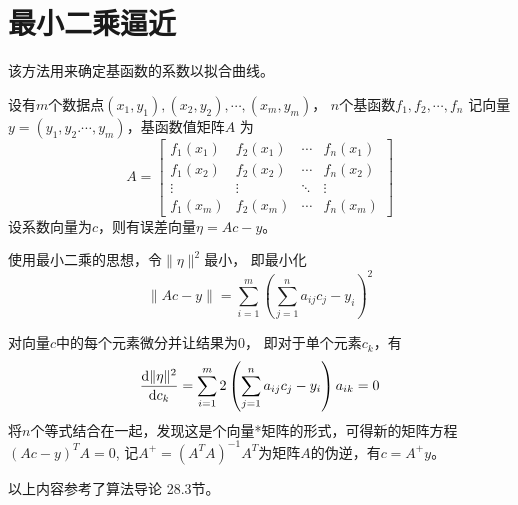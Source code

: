 \section{最小二乘逼近}
该方法用来确定基函数的系数以拟合曲线。

设有$m$个数据点$(x_1,y_1),(x_2,y_2),\cdots,(x_m,y_m)$，
$n$个基函数$f_1,f_2,\cdots,f_n$
记向量$y=(y_1,y_2.\cdots,y_m)$，基函数值矩阵$A$
为\begin{displaymath}
    A=\left[
    \begin{array}{cccc}
    f_1(x_1)&f_2(x_1)&\cdots&f_n(x_1)\\
    f_1(x_2)&f_2(x_2)&\cdots&f_n(x_2)\\
    \vdots&\vdots&\ddots&\vdots\\
    f_1(x_m)&f_2(x_m)&\cdots&f_n(x_m)
    \end{array}
    \right]
\end{displaymath}
设系数向量为$c$，则有误差向量$\eta=Ac-y$。

使用最小二乘的思想，令$\|\eta\|^2$最小，
即最小化
\begin{displaymath}
    \|Ac-y\|=\sum_{i=1}^m{\left(\sum_{j=1}^n{a_{ij}c_j}-y_i\right)}^2
\end{displaymath}

对向量$c$中的每个元素微分并让结果为0，
即对于单个元素$c_k$，有
\begin{displaymath}
    \frac{\mathrm{d} \|\eta\|^2}{\mathrm{d} c_k}=\sum_{i=1}^m{2\left(
        \sum_{j=1}^n{a_{ij}c_j-y_i}\right)a_{ik}}=0
\end{displaymath}
将$n$个等式结合在一起，发现这是个向量*矩阵的形式，可得新的矩阵方程$(Ac-y)^TA=0$,
记$A^+=(A^TA)^{-1}A^T$为矩阵$A$的伪逆，有$c=A^+y$。

以上内容参考了算法导论\cite{ITA3} 28.3节。

